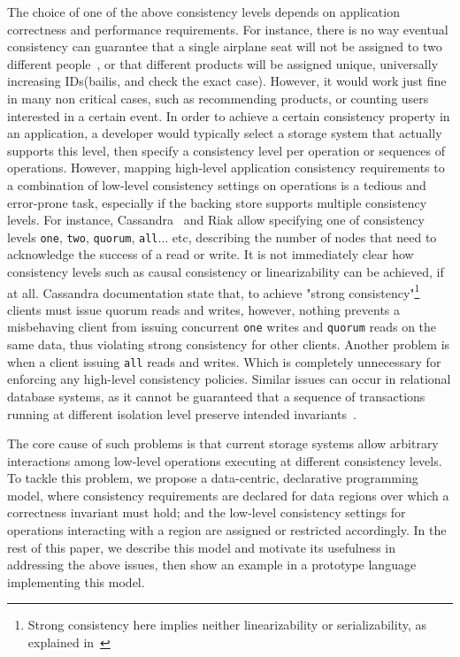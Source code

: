 \documentclass[preprint, numbers]{sigplanconf}
\begin{document}
The choice of one of the above consistency levels depends on application
correctness and performance requirements. For instance, there is no way eventual consistency
can guarantee that a single airplane seat will not be assigned to two different
people~\cite{bailis2014coordination}, or that different products will be assigned unique, universally
increasing IDs(bailis, and check the exact case). However, it would work just fine
in many non critical cases, such as recommending products, or counting users
interested in a certain event. In order to achieve a certain consistency
property in an application, a developer would typically select a storage system that
actually supports this level, then specify a consistency level per operation or
sequences of operations. However, mapping high-level application consistency requirements to  a combination of
low-level consistency settings on operations is a tedious and error-prone task, especially if
the backing store supports multiple consistency levels. For instance,
Cassandra~\cite{lakshman2010cassandra} and Riak allow specifying one of consistency levels
\texttt{one}, \texttt{two}, \texttt{quorum}, \texttt{all}... etc, describing the number of nodes that need to
acknowledge the success of a read or write. It
is not immediately clear how consistency levels such as causal consistency or
linearizability can be achieved, if at all.  Cassandra documentation state that,
to achieve "strong consistency"\footnote{ Strong consistency here implies
neither linearizability or serializability, as explained in~\cite{sivaramakrishnan2016representation}} clients must issue quorum reads and writes,
however, nothing prevents a misbehaving client from issuing concurrent \texttt{one} writes and
\texttt{quorum} reads on the same data, thus violating strong consistency for other clients. Another
problem is when a client issuing \texttt{all} reads and writes. Which is completely
unnecessary for enforcing any high-level consistency policies. Similar issues
can occur in relational database systems, as it cannot be guaranteed that a
sequence of transactions running at different isolation level preserve intended
invariants~\cite{gray1992transaction}. 

The core cause of such problems is that current storage systems allow arbitrary
interactions among low-level operations executing at different consistency levels. To
tackle this problem, we propose a data-centric, declarative programming model, where
consistency requirements are declared for data regions over which a correctness
invariant must hold; and the low-level consistency settings for operations interacting with
a region are assigned or restricted accordingly. In the rest of this paper, we describe this
model and motivate its usefulness in addressing the above issues, then show
an example in a prototype language implementing this model.
\end{document}
